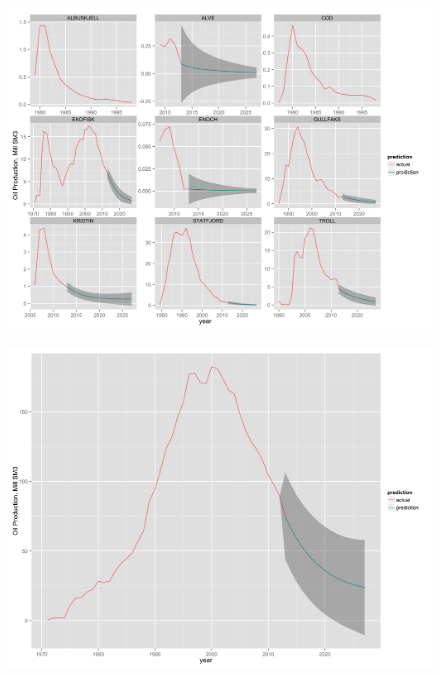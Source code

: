 \documentclass{beamer}
\begin{document}

\begin{frame}[plain]
	\begin{figure}
	\includegraphics[width=1\textwidth]{field_lev_forecast.png}
	\end{figure}
\end{frame}

\begin{frame}[plain]
	\begin{figure}
	\includegraphics[width=1\textwidth]{tot_forecast.png}
	\end{figure}
\end{frame}
\end{document}
